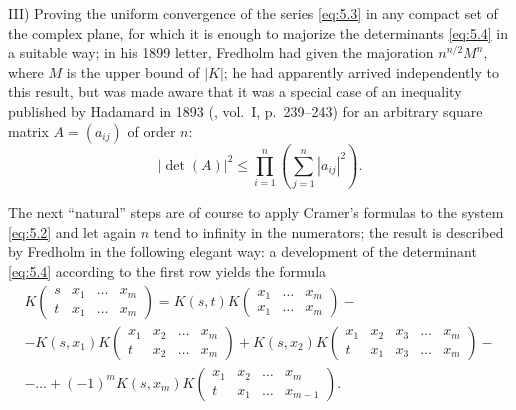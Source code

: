 \documentclass[12pt,a4paper,leqno,twoside]{extbook}
\begin{document}
III) Proving the uniform convergence of the series \eqref{eq:5.3} in any compact set of the complex plane, for which it is enough to majorize the determinants \eqref{eq:5.4} in a suitable way; in his 1899 letter, Fredholm had given the majoration \(n^{n/2} M^n\), where \(M\) is the upper bound of \(|K|\); he had apparently arrived independently to this result, but was made aware that it was a special case of an inequality published by Hadamard in 1893 (\cite{094}, vol.~I, p.~239--243) for an arbitrary square matrix \(A = (a_{ij})\) of order \(n\):
\begin{equation}
    \label{eq:5.5}
    |\det(A)|^2 \leq \prod_{i=1}^n \left( \sum_{j=1}^n |a_{ij}|^2 \right).
\end{equation}

The next ``natural'' steps are of course to apply Cramer's formulas to the system \eqref{eq:5.2} and let again \(n\) tend to infinity in the numerators; the result is described by Fredholm in the following elegant way: a development of the determinant \eqref{eq:5.4} according to the first row yields the formula
\begin{equation}
    \label{eq:5.6}
    \begin{gathered}
        K
        \left(
        \begin{matrix}
            s & x_1 & \ldots & x_m \\
            t & x_1 & \ldots & x_m
        \end{matrix}
        \right)
        = K(s, t) K
        \left(
        \begin{matrix}
            x_1 & \ldots & x_m \\
            x_1 & \ldots & x_m
        \end{matrix}
        \right)
        - \\
        - K(s, x_1) K
        \left(
        \begin{matrix}
            x_1 & x_2 & \ldots & x_m \\
            t   & x_2 & \ldots & x_m
        \end{matrix}
        \right)
        + K(s, x_2) K
        \left(
        \begin{matrix}
            x_1 & x_2 & x_3 & \ldots & x_m \\
            t   & x_1 & x_3 & \ldots & x_m
        \end{matrix}
        \right)
        - \\
        - \ldots + (-1)^m K(s, x_m) K
        \left(
        \begin{matrix}
            x_1 & x_2 & \ldots & x_m \\
            t   & x_1 & \ldots & x_{m-1}
        \end{matrix}
        \right)
        .
    \end{gathered}
\end{equation}
\end{document}

